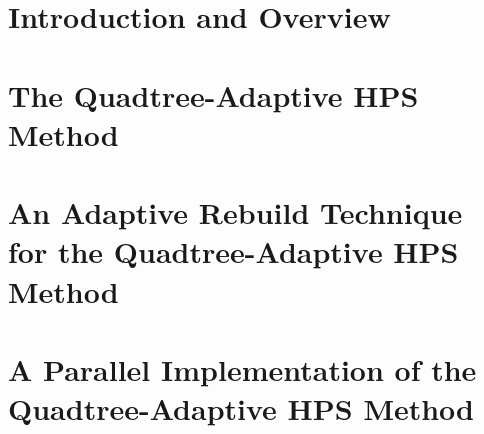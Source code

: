 \documentclass[12pt,twoside]{report}
\begin{document}

\begintext
\chapter{Introduction and Overview}
\label{chap:intro}

% 




% 
% 
% 

\chapter{The Quadtree-Adaptive HPS Method}
\label{chap:qahps}







\chapter{An Adaptive Rebuild Technique for the Quadtree-Adaptive HPS Method}
\label{chap:adaptive-build}

% 




\chapter{A Parallel Implementation of the Quadtree-Adaptive HPS Method}
\label{chap:parallel}




\end{document}
